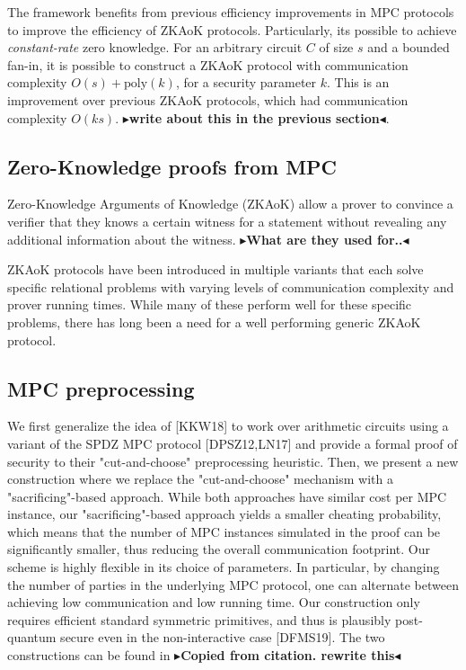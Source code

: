 \documentclass[twoside,11pt,openright]{report}
\theoremstyle{definition}
\theoremstyle{plain}
\newcommand{\todo}[1]{{\color[rgb]{.5,0,0}\textbf{$\blacktriangleright$#1$\blacktriangleleft$}}}
\begin{document}
The framework benefits from previous efficiency improvements in MPC protocols to improve the efficiency of ZKAoK protocols. Particularly, its possible to achieve \textit{constant-rate} zero knowledge. For an arbitrary circuit $C$ of size $s$ and a bounded fan-in, it is possible to construct a ZKAoK protocol with communication complexity $O(s) + \text{poly}(k)$, for a security parameter $k$. This is an improvement over previous ZKAoK protocols, which had communication complexity $O(ks)$. \todo{write about this in the previous section}.

\subsection{Zero-Knowledge proofs from MPC}
\label{sec:zkmpc}

Zero-Knowledge Arguments of Knowledge (ZKAoK) allow a prover to convince a verifier that they knows a certain witness for a statement without revealing any additional information about the witness. \todo{What are they used for..}

ZKAoK protocols have been introduced in multiple variants that each solve specific relational problems with varying levels of communication complexity and prover running times. While many of these perform well for these specific problems, there has long been a need for a well performing generic ZKAoK protocol.


\subsection{MPC preprocessing}

We first generalize the idea of [KKW18] to work over arithmetic circuits using a variant of the SPDZ MPC protocol [DPSZ12,LN17] and provide a formal proof of security to their "cut-and-choose" preprocessing heuristic. Then, we present a new construction where we replace the "cut-and-choose" mechanism with a "sacrificing"-based approach. While both approaches have similar cost per MPC instance, our "sacrificing"-based approach yields a smaller cheating probability, which means that the number of MPC instances simulated in the proof can be significantly smaller, thus reducing the overall communication footprint. Our scheme is highly flexible in its choice of parameters. In particular, by changing the number of parties in the underlying MPC protocol, one can alternate between achieving low communication and low running time. Our construction only requires efficient standard symmetric primitives, and thus is plausibly post-quantum secure even in the non-interactive case [DFMS19]. The two constructions can be found in \cite{baum2020concretely} \todo{Copied from citation. rewrite this}
\end{document}
